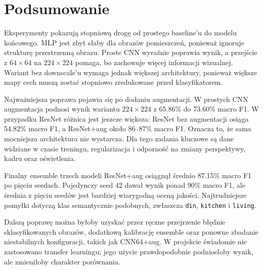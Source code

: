 \documentclass[12pt,a4paper]{article}
\begin{document}
\section{Podsumowanie}

Eksperymenty pokazują stopniową drogę od prostego baseline'u do modelu końcowego. MLP jest zbyt słaby dla obrazów pomieszczeń, ponieważ ignoruje strukturę przestrzenną obrazu. Proste CNN wyraźnie poprawia wynik, a przejście z \(64 \times 64\) na \(224 \times 224\) pomaga, bo zachowuje więcej informacji wizualnej. Wariant bez downscale'u wymaga jednak większej architektury, ponieważ większe mapy cech muszą zostać stopniowo zredukowane przed klasyfikatorem.

Najważniejsza poprawa pojawia się po dodaniu augmentacji. W prostych CNN augmentacja podnosi wynik wariantu \(224 \times 224\) z 65.86\% do 73.60\% macro F1. W przypadku ResNet różnica jest jeszcze większa: ResNet bez augmentacji osiąga 54.82\% macro F1, a ResNet+aug około 86--87\% macro F1. Oznacza to, że sama mocniejsza architektura nie wystarcza. Dla tego zadania kluczowe są dane widziane w czasie treningu, regularizacja i odporność na zmiany perspektywy, kadru oraz oświetlenia.

Finalny ensemble trzech modeli ResNet+aug osiągnął średnio 87.15\% macro F1 po pięciu seedach. Pojedynczy seed 42 dawał wynik ponad 90\% macro F1, ale średnia z pięciu seedów jest bardziej wiarygodną oceną jakości. Najtrudniejsze pomyłki dotyczą klas semantycznie podobnych, zwłaszcza \texttt{din}, \texttt{kitchen} i \texttt{living}.

Dalszą poprawę można byłoby uzyskać przez ręczne przejrzenie błędnie sklasyfikowanych obrazów, dodatkową kalibrację ensemble oraz ponowne zbadanie niestabilnych konfiguracji, takich jak CNN64+aug. W projekcie świadomie nie zastosowano transfer learningu; jego użycie prawdopodobnie podniosłoby wynik, ale zmieniłoby charakter porównania.
\end{document}
